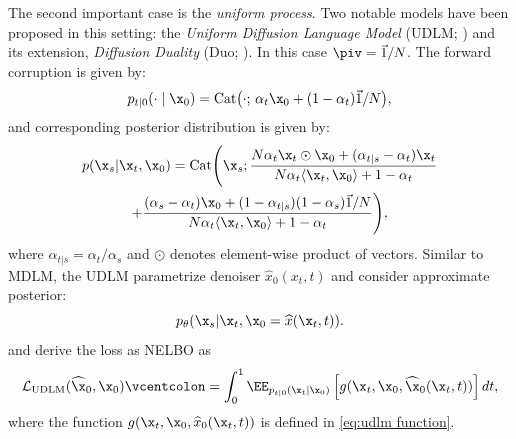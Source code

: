   The second important case is the \textit{uniform process}. Two notable models have been proposed in this setting: the \textit{Uniform Diffusion Language Model} (UDLM; \citealp{schiff2024discreteguidance}) and its extension, \textit{Diffusion Duality} (Duo; \citealp{sahoo2025the}). In this case $\piv = \vec{1}/N$. The forward corruption is given by:
  \begin{equation}
    p_{t|0}(\cdot \mid \x_0)
    = \text{Cat} \big(\cdot;\, \alpha_t \x_0 + (1-\alpha_t)\vec{1}/N\big),
  \end{equation}
  and corresponding posterior distribution is given by:
  \begin{gather}
    \label{eq:uniform true reverse posterior}    
    p(\x_s|\x_t, \x_0)
    = \text{Cat} \Bigg(\x_s;
        \frac{
            N\alpha_t \x_t \odot \x_0 + (\alpha_{t|s} - \alpha_t)\x_t
            }
            {
             N \alpha_t \langle \x_t, \x_0\rangle  + 1 - \alpha_t
            } \nonumber \\
        + \frac{
            (\alpha_s - \alpha_t)\x_0 + (1 - \alpha_{t|s})(1- \alpha_s)\vec{1} / N
            }
            {
             N \alpha_t \langle \x_t, \x_0\rangle  + 1 - \alpha_t
            }
        \Bigg),
\end{gather}
  where $\alpha_{t|s} = \alpha_t/\alpha_s$ and $\odot$ denotes element-wise product of vectors. Similar to MDLM, the UDLM parametrize denoiser $\widehat{x}_0(x_t, t)$ and consider approximate posterior:
  $$
    p_{\theta}(\x_s|\x_t, \x_0 = \widehat{x}(\x_t, t)).
  $$
  and derive the loss as NELBO as
  \begin{equation}
       \mathcal{L}_{\text{UDLM}}(\widehat{\x}_0,\x_0) \vcentcolon= \int_0^1 \EE_{p_{t|0}(\x_t|\x_0)} \left[g(\x_t,\x_0, \widehat{\x}_0(\x_t, t))\right] dt, \nonumber
  \end{equation}
  where the function $g(\x_t,\x_0, \widehat{x}_0(\x_t, t))$ is defined in \eqref{eq:udlm function}.

